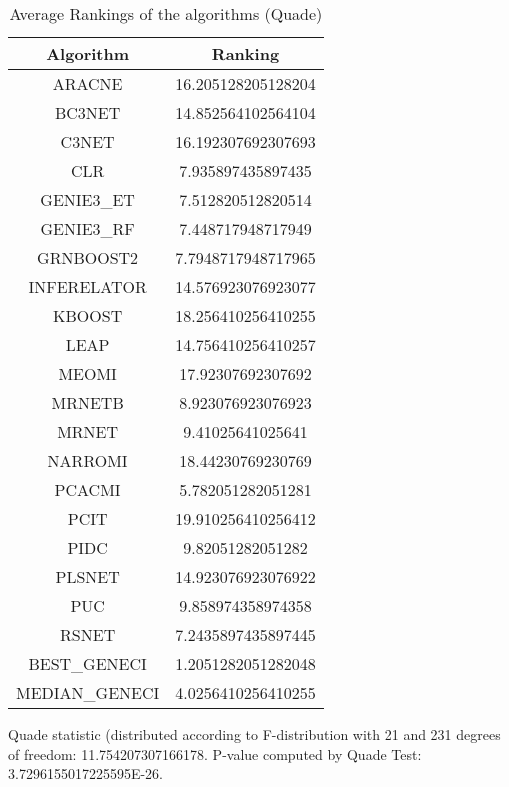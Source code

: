 \documentclass[a4paper,10pt]{article}
\begin{document}
\begin{landscape}
\begin{table}[!htp]
\centering
\caption{Average Rankings of the algorithms (Quade)
}\begin{tabular}{c|c}
Algorithm&Ranking\\
\hline
ARACNE&16.205128205128204\\
BC3NET&14.852564102564104\\
C3NET&16.192307692307693\\
CLR&7.935897435897435\\
GENIE3_ET&7.512820512820514\\
GENIE3_RF&7.448717948717949\\
GRNBOOST2&7.7948717948717965\\
INFERELATOR&14.576923076923077\\
KBOOST&18.256410256410255\\
LEAP&14.756410256410257\\
MEOMI&17.92307692307692\\
MRNETB&8.923076923076923\\
MRNET&9.41025641025641\\
NARROMI&18.44230769230769\\
PCACMI&5.782051282051281\\
PCIT&19.910256410256412\\
PIDC&9.82051282051282\\
PLSNET&14.923076923076922\\
PUC&9.858974358974358\\
RSNET&7.2435897435897445\\
BEST_GENECI&1.2051282051282048\\
MEDIAN_GENECI&4.0256410256410255\\
\end{tabular}
\end{table}
Quade statistic (distributed according to F-distribution with 21 and 231 degrees of freedom: 11.754207307166178. 
P-value computed by Quade Test: 3.7296155017225595E-26.\newline


\newpage


\end{landscape}
\end{document}
